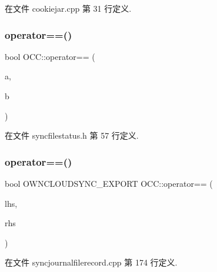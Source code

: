 在文件 cookiejar.\+cpp 第 31 行定义.

\mbox{\label{namespace_o_c_c_a41b5dd4092d2ebfda1992a5ae7476daa}} 
\subsubsection{\texorpdfstring{operator==()}{operator==()}\hspace{0.1cm}{\footnotesize\ttfamily [1/4]}}
{\footnotesize\ttfamily bool O\+C\+C\+::operator== (\begin{DoxyParamCaption}\item[{const \hyperlink{class_o_c_c_1_1_sync_file_status}{Sync\+File\+Status} \&}]{a,  }\item[{const \hyperlink{class_o_c_c_1_1_sync_file_status}{Sync\+File\+Status} \&}]{b }\end{DoxyParamCaption})}



在文件 syncfilestatus.\+h 第 57 行定义.

\mbox{\label{namespace_o_c_c_a8490465b9d53659e960b7701d8c84e52}} 
\subsubsection{\texorpdfstring{operator==()}{operator==()}\hspace{0.1cm}{\footnotesize\ttfamily [2/4]}}
{\footnotesize\ttfamily bool O\+W\+N\+C\+L\+O\+U\+D\+S\+Y\+N\+C\+\_\+\+E\+X\+P\+O\+RT O\+C\+C\+::operator== (\begin{DoxyParamCaption}\item[{const \hyperlink{class_o_c_c_1_1_sync_journal_file_record}{Sync\+Journal\+File\+Record} \&}]{lhs,  }\item[{const \hyperlink{class_o_c_c_1_1_sync_journal_file_record}{Sync\+Journal\+File\+Record} \&}]{rhs }\end{DoxyParamCaption})}



在文件 syncjournalfilerecord.\+cpp 第 174 行定义.

\mbox{\label{namespace_o_c_c_adaf2ff16c9c33507fc4cafd261283a47}} 

